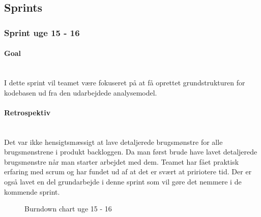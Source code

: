 \documentclass[../main.tex]{subfiles}
\begin{document}
\subsection{Sprints}

\tocless\subsubsection{Sprint uge 15 - 16}
\paragraph{Goal}\mbox{}\\
I dette sprint vil teamet være fokuseret på at få oprettet grundstrukturen for kodebasen ud fra den udarbejdede analysemodel.

\paragraph{Retrospektiv}\mbox{}\\
Det var ikke hensigtsmæssigt at lave detaljerede brugsmønstre for alle brugsmønstrene i produkt backloggen. Da man først brude have lavet detaljerede brugsmønstre når man starter arbejdet med dem. Teamet har fået praktisk erfaring med scrum og har fundet ud af at det er svært at pririotere tid. Der er også lavet en del grundarbejde i denne sprint som vil gøre det nemmere i de kommende sprint.

\begin{center}
\begin{figure}[H]
\footnotesize
\centering
{}
    \caption{Burndown chart uge 15 - 16}
    \label{fig:burndown_15_16}
\end{figure}
\end{center}
\end{document}
